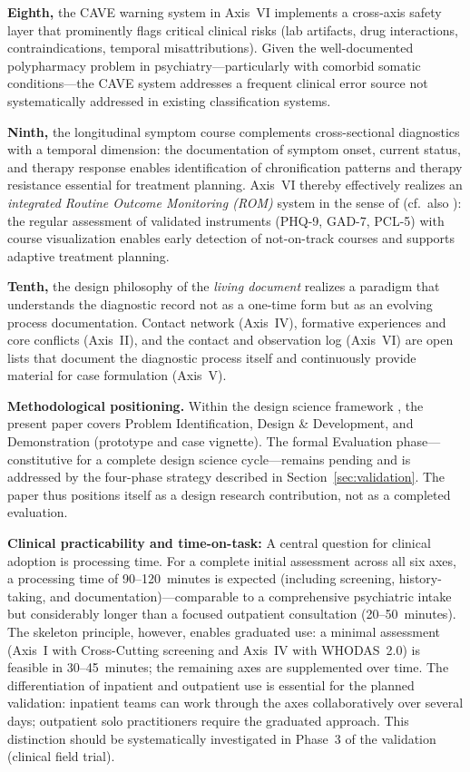 \documentclass[11pt,a4paper]{article}
\begin{document}
\textbf{Eighth,} the CAVE warning system in Axis~VI implements a cross-axis safety layer that prominently flags critical clinical risks (lab artifacts, drug interactions, contraindications, temporal misattributions). Given the well-documented polypharmacy problem in psychiatry---particularly with comorbid somatic conditions---the CAVE system addresses a frequent clinical error source not systematically addressed in existing classification systems.

\textbf{Ninth,} the longitudinal symptom course complements cross-sectional diagnostics with a temporal dimension: the documentation of symptom onset, current status, and therapy response enables identification of chronification patterns and therapy resistance essential for treatment planning. Axis~VI thereby effectively realizes an \textit{integrated Routine Outcome Monitoring (ROM)} system in the sense of \citet{Barkham2023} (cf.\ also \citealp{Huber2022}): the regular assessment of validated instruments (PHQ-9, GAD-7, PCL-5) with course visualization enables early detection of not-on-track courses and supports adaptive treatment planning.

\textbf{Tenth,} the design philosophy of the \textit{living document} realizes a paradigm that understands the diagnostic record not as a one-time form but as an evolving process documentation. Contact network (Axis~IV), formative experiences and core conflicts (Axis~II), and the contact and observation log (Axis~VI) are open lists that document the diagnostic process itself and continuously provide material for case formulation (Axis~V).

\vspace{0.5em}
\textbf{Methodological positioning.} Within the design science framework \citep{Hevner2004, Peffers2007}, the present paper covers Problem Identification, Design \& Development, and Demonstration (prototype and case vignette). The formal Evaluation phase---constitutive for a complete design science cycle---remains pending and is addressed by the four-phase strategy described in Section~\ref{sec:validation}. The paper thus positions itself as a design research contribution, not as a completed evaluation.

\textbf{Clinical practicability and time-on-task:} A central question for clinical adoption is processing time. For a complete initial assessment across all six axes, a processing time of 90--120~minutes is expected (including screening, history-taking, and documentation)---comparable to a comprehensive psychiatric intake but considerably longer than a focused outpatient consultation (20--50~minutes). The skeleton principle, however, enables graduated use: a minimal assessment (Axis~I with Cross-Cutting screening and Axis~IV with WHODAS~2.0) is feasible in 30--45~minutes; the remaining axes are supplemented over time. The differentiation of inpatient and outpatient use is essential for the planned validation: inpatient teams can work through the axes collaboratively over several days; outpatient solo practitioners require the graduated approach. This distinction should be systematically investigated in Phase~3 of the validation (clinical field trial).
\end{document}
